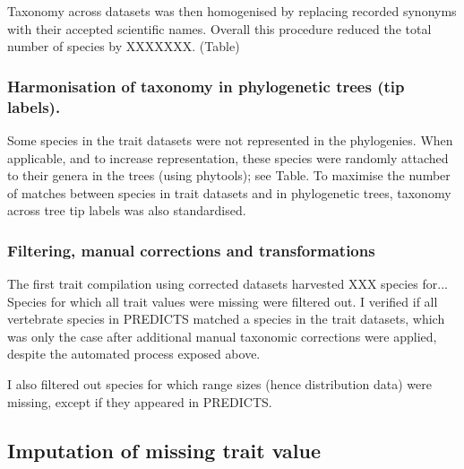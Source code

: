Taxonomy across datasets was then homogenised by replacing recorded synonyms with their accepted scientific names. Overall this procedure reduced the total number of species by XXXXXXX. (Table)



\subsubsection{Harmonisation of taxonomy in phylogenetic trees (tip labels).}
Some species in the trait datasets were not represented in the phylogenies. When applicable, and to increase representation, these species were randomly attached to their genera in the trees (using phytools); see Table. To maximise the number of matches between species in trait datasets and in phylogenetic trees, taxonomy across tree tip labels was also standardised.

\subsubsection{Filtering, manual corrections and transformations}
The first trait compilation using corrected datasets harvested XXX species for...
Species for which all trait values were missing were filtered out. I verified if all vertebrate species in PREDICTS matched a species in the trait datasets, which was only the case after additional manual taxonomic corrections were applied, despite the automated process exposed above. 

I also filtered out species for which range sizes (hence distribution data) were missing, except if they appeared in PREDICTS. 

\subsection{Imputation of missing trait value}

